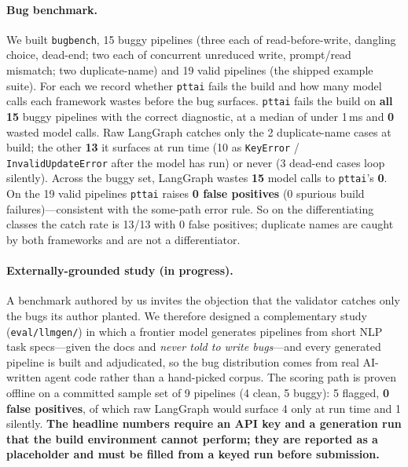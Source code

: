 \documentclass[11pt]{article}
\newcommand{\code}[1]{\texttt{#1}}
\begin{document}
\paragraph{Bug benchmark.} We built \code{bugbench}, 15 buggy pipelines (three
each of read-before-write, dangling choice, dead-end; two each of concurrent
unreduced write, prompt/read mismatch; two duplicate-name) and 19 valid
pipelines (the shipped example suite). For each we record whether \code{pttai}
fails the build and how many model calls each framework wastes before the bug
surfaces. \code{pttai} fails the build on \textbf{all 15} buggy pipelines with
the correct diagnostic, at a median of under 1\,ms and \textbf{0} wasted model
calls. Raw LangGraph catches only the 2 duplicate-name cases at build; the other
\textbf{13} it surfaces at run time (10 as \code{KeyError} /
\code{InvalidUpdateError} after the model has run) or never (3 dead-end cases
loop silently). Across the buggy set, LangGraph wastes \textbf{15} model calls to
\code{pttai}'s \textbf{0}. On the 19 valid pipelines \code{pttai} raises
\textbf{0 false positives} (0 spurious build failures)---consistent with the
some-path error rule. So on the differentiating classes the catch rate is
13/13 with 0 false positives; duplicate names are caught by both frameworks and
are not a differentiator.

\paragraph{Externally-grounded study (in progress).} A benchmark authored by us
invites the objection that the validator catches only the bugs its author
planted. We therefore designed a complementary study
(\code{eval/llmgen/}) in which a frontier model generates pipelines from short
NLP task specs---given the docs and \emph{never told to write bugs}---and every
generated pipeline is built and adjudicated, so the bug distribution comes from
real AI-written agent code rather than a hand-picked corpus. The scoring path is
proven offline on a committed sample set of 9 pipelines (4 clean, 5 buggy): 5
flagged, \textbf{0 false positives}, of which raw LangGraph would surface 4 only
at run time and 1 silently. \textbf{The headline numbers require an API key and a
generation run that the build environment cannot perform; they are reported as a
placeholder and must be filled from a keyed run before submission.}
\end{document}
